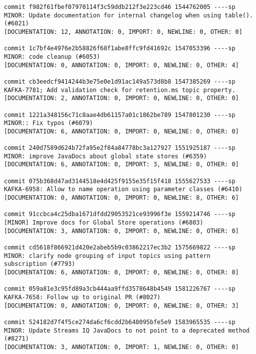 \begin{lstlisting}
commit f982f61fbef07970114f3c59ddb212f3e223cd46 1544762005 ----sp
MINOR: Update documentation for internal changelog when using table(). (#6021)                      
[DOCUMENTATION: 12, ANNOTATION: 0, IMPORT: 0, NEWLINE: 0, OTHER: 0]

commit 1c7bf4e4976e2b58826f68f1abe8ffc9fd41692c 1547053396 ----sp
MINOR: code cleanup (#6053)                                                                         
[DOCUMENTATION: 0, ANNOTATION: 0, IMPORT: 0, NEWLINE: 0, OTHER: 4]

commit cb3eedcf9414244b3e75e0e1d91ac149a573d8b8 1547385269 ----sp
KAFKA-7781; Add validation check for retention.ms topic property.                                   
[DOCUMENTATION: 2, ANNOTATION: 0, IMPORT: 0, NEWLINE: 0, OTHER: 0]

commit 1221a348156c71c8aae4db61157a01c1862be789 1547801230 ----sp
MINOR:: Fix typos (#6079)                                                                           
[DOCUMENTATION: 6, ANNOTATION: 0, IMPORT: 0, NEWLINE: 0, OTHER: 0]

commit 240d7589d624b72fa95e2f84a84778bc3a127927 1551925187 ----sp
MINOR: improve JavaDocs about global state stores (#6359)                                           
[DOCUMENTATION: 6, ANNOTATION: 0, IMPORT: 3, NEWLINE: 0, OTHER: 0]

commit 075b368d47ad3144518e4d425f9155e35f15f418 1555627533 ----sp
KAFKA-6958: Allow to name operation using parameter classes (#6410)                                 
[DOCUMENTATION: 0, ANNOTATION: 0, IMPORT: 0, NEWLINE: 8, OTHER: 6]

commit 91ccbca4c25dba1671dfdd29053521ce93996f3e 1559214746 ----sp
[MINOR] Improve docs for Global Store operations (#6803)                                            
[DOCUMENTATION: 3, ANNOTATION: 0, IMPORT: 0, NEWLINE: 0, OTHER: 0]

commit cd5618f866921d420e2abeb5b9c03862217ec3b2 1575669822 ----sp
MINOR: clarify node grouping of input topics using pattern subscription (#7793)                     
[DOCUMENTATION: 6, ANNOTATION: 0, IMPORT: 0, NEWLINE: 0, OTHER: 0]

commit 059a81e3c95fd89a3cb444aa9ffd3578648b4549 1581226767 ----sp
KAFKA-7658: Follow up to original PR (#8027)                                                        
[DOCUMENTATION: 0, ANNOTATION: 0, IMPORT: 0, NEWLINE: 0, OTHER: 3]

commit 524182d7f4f5ce274da6cf6cdd2b648095bfe5e9 1583965535 ----sp
MINOR: Update Streams IQ JavaDocs to not point to a deprecated method (#8271)                       
[DOCUMENTATION: 3, ANNOTATION: 0, IMPORT: 1, NEWLINE: 0, OTHER: 0]


\end{lstlisting}
